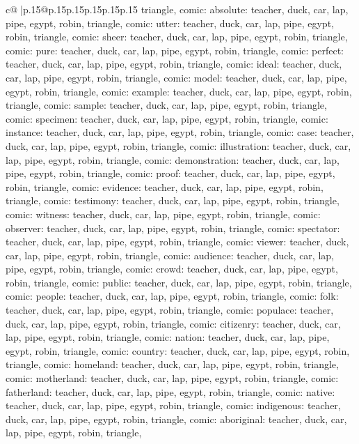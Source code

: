 \documentclass{article}
\begin{document}
{\begin{supertabular}{c@{$\;$}|p{.15\linewidth}@{}p{.15\linewidth}p{.15\linewidth}p{.15\linewidth}p{.15\linewidth}p{.15\linewidth}}
{{{triangle, comic\n\nCLUE: absolute\nTARGETS: teacher, duck, car, lap, pipe, egypt, robin, triangle, comic\n\nCLUE: utter\nTARGETS: teacher, duck, car, lap, pipe, egypt, robin, triangle, comic\n\nCLUE: sheer\nTARGETS: teacher, duck, car, lap, pipe, egypt, robin, triangle, comic\n\nCLUE: pure\nTARGETS: teacher, duck, car, lap, pipe, egypt, robin, triangle, comic\n\nCLUE: perfect\nTARGETS: teacher, duck, car, lap, pipe, egypt, robin, triangle, comic\n\nCLUE: ideal\nTARGETS: teacher, duck, car, lap, pipe, egypt, robin, triangle, comic\n\nCLUE: model\nTARGETS: teacher, duck, car, lap, pipe, egypt, robin, triangle, comic\n\nCLUE: example\nTARGETS: teacher, duck, car, lap, pipe, egypt, robin, triangle, comic\n\nCLUE: sample\nTARGETS: teacher, duck, car, lap, pipe, egypt, robin, triangle, comic\n\nCLUE: specimen\nTARGETS: teacher, duck, car, lap, pipe, egypt, robin, triangle, comic\n\nCLUE: instance\nTARGETS: teacher, duck, car, lap, pipe, egypt, robin, triangle, comic\n\nCLUE: case\nTARGETS: teacher, duck, car, lap, pipe, egypt, robin, triangle, comic\n\nCLUE: illustration\nTARGETS: teacher, duck, car, lap, pipe, egypt, robin, triangle, comic\n\nCLUE: demonstration\nTARGETS: teacher, duck, car, lap, pipe, egypt, robin, triangle, comic\n\nCLUE: proof\nTARGETS: teacher, duck, car, lap, pipe, egypt, robin, triangle, comic\n\nCLUE: evidence\nTARGETS: teacher, duck, car, lap, pipe, egypt, robin, triangle, comic\n\nCLUE: testimony\nTARGETS: teacher, duck, car, lap, pipe, egypt, robin, triangle, comic\n\nCLUE: witness\nTARGETS: teacher, duck, car, lap, pipe, egypt, robin, triangle, comic\n\nCLUE: observer\nTARGETS: teacher, duck, car, lap, pipe, egypt, robin, triangle, comic\n\nCLUE: spectator\nTARGETS: teacher, duck, car, lap, pipe, egypt, robin, triangle, comic\n\nCLUE: viewer\nTARGETS: teacher, duck, car, lap, pipe, egypt, robin, triangle, comic\n\nCLUE: audience\nTARGETS: teacher, duck, car, lap, pipe, egypt, robin, triangle, comic\n\nCLUE: crowd\nTARGETS: teacher, duck, car, lap, pipe, egypt, robin, triangle, comic\n\nCLUE: public\nTARGETS: teacher, duck, car, lap, pipe, egypt, robin, triangle, comic\n\nCLUE: people\nTARGETS: teacher, duck, car, lap, pipe, egypt, robin, triangle, comic\n\nCLUE: folk\nTARGETS: teacher, duck, car, lap, pipe, egypt, robin, triangle, comic\n\nCLUE: populace\nTARGETS: teacher, duck, car, lap, pipe, egypt, robin, triangle, comic\n\nCLUE: citizenry\nTARGETS: teacher, duck, car, lap, pipe, egypt, robin, triangle, comic\n\nCLUE: nation\nTARGETS: teacher, duck, car, lap, pipe, egypt, robin, triangle, comic\n\nCLUE: country\nTARGETS: teacher, duck, car, lap, pipe, egypt, robin, triangle, comic\n\nCLUE: homeland\nTARGETS: teacher, duck, car, lap, pipe, egypt, robin, triangle, comic\n\nCLUE: motherland\nTARGETS: teacher, duck, car, lap, pipe, egypt, robin, triangle, comic\n\nCLUE: fatherland\nTARGETS: teacher, duck, car, lap, pipe, egypt, robin, triangle, comic\n\nCLUE: native\nTARGETS: teacher, duck, car, lap, pipe, egypt, robin, triangle, comic\n\nCLUE: indigenous\nTARGETS: teacher, duck, car, lap, pipe, egypt, robin, triangle, comic\n\nCLUE: aboriginal\nTARGETS: teacher, duck, car, lap, pipe, egypt, robin, triangle, }}}
\end{supertabular}}
\end{document}
